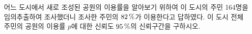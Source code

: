 어느 도시에서 새로 조성된 공원의 이용률을 알아보기 위하여 이 도시의 주민 164명을 임의추출하여 조사했더니 조사한 주민의 $82\mkern3mu \%$가 이용한다고 답하였다. 이 도시 전체 주민의 공원의 이용률 $p$에 대한 신뢰도 $95\mkern3mu \%$의 신뢰구간을 구하시오. 
